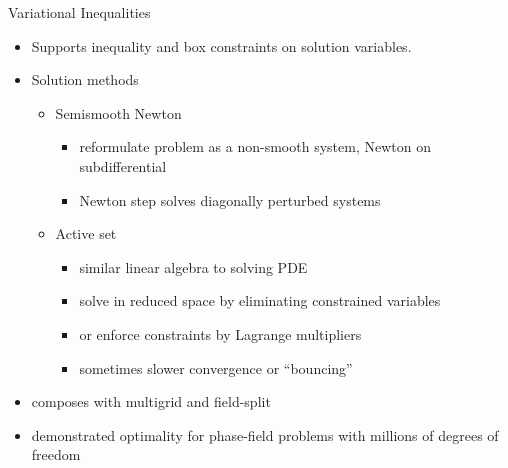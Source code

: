\begin{frame}{Variational Inequalities}
  \begin{itemize}
  \item Supports inequality and box constraints on solution variables.
  \item Solution methods
    \begin{itemize}
    \item Semismooth Newton
      \begin{itemize}
      \item reformulate problem as a non-smooth system, Newton on subdifferential
      \item Newton step solves diagonally perturbed systems
      \end{itemize}
    \item Active set
      \begin{itemize}
      \item similar linear algebra to solving PDE
      \item solve in reduced space by eliminating constrained variables
      \item or enforce constraints by Lagrange multipliers
      \item sometimes slower convergence or ``bouncing''
      \end{itemize}
    \end{itemize}
  \item composes with multigrid and field-split
  \item demonstrated optimality for phase-field problems with millions of degrees of freedom
  \end{itemize}
\end{frame}
